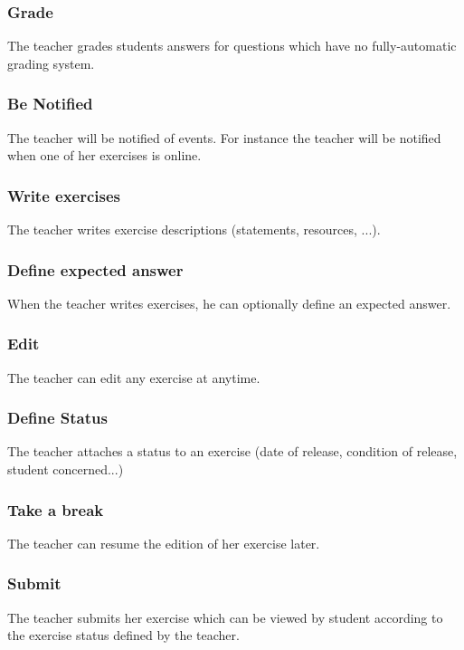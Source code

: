 		\subsubsection{Grade}
			The teacher grades students answers for questions which have no fully-automatic grading system.
		\subsubsection{Be Notified}
			The teacher will be notified of events.
			For instance the teacher will be notified when one of her exercises is online.
		\subsubsection{Write exercises}
			The teacher writes exercise descriptions (statements, resources, ...).
		\subsubsection{Define expected answer}
			When the teacher writes exercises, he can optionally define an expected answer.
		\subsubsection{Edit}
			The teacher can edit any exercise at anytime.
		\subsubsection{Define Status}
			The teacher attaches a status to an exercise (date of release, condition of release, student concerned...) 
		\subsubsection{Take a break}
			The teacher can resume the edition of her exercise later.
		\subsubsection{Submit}
			The teacher submits her exercise which can be viewed by student according to the exercise status defined by the teacher.
